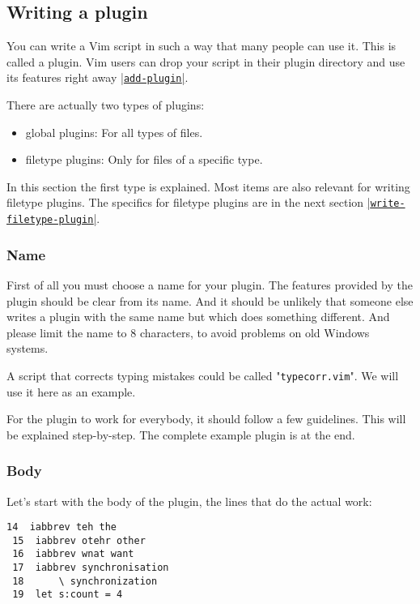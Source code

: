 \subsection{Writing a plugin}
\label{Writing a plugin}
\label{write-plugin}
You can write a Vim script in such a way that many people can use it.
This is called a plugin.
Vim users can drop your script in their plugin directory and use its features right away \hyperref[add-plugin]{|\texttt{add-plugin}|}.

There are actually two types of plugins:
\begin{itemize}
				\item global plugins: For all types of files.
				\item filetype plugins: Only for files of a specific type.
\end{itemize}

In this section the first type is explained.
Most items are also relevant for writing filetype plugins.
The specifics for filetype plugins are in the next section \hyperref[write-filetype-plugin]{|\texttt{write-filetype-plugin}|}.

\subsubsection{Name}
First of all you must choose a name for your plugin.
The features provided by the plugin should be clear from its name.
And it should be unlikely that someone else writes a plugin with the same name but which does something different.
And please limit the name to 8 characters, to avoid problems on old Windows systems.

A script that corrects typing mistakes could be called "\verb!typecorr.vim!".
We will use it here as an example.

For the plugin to work for everybody, it should follow a few guidelines.
This will be explained step-by-step.
The complete example plugin is at the end.

\subsubsection{Body}
Let's start with the body of the plugin, the lines that do the actual work:

\begin{Verbatim}[samepage=true]
 14  iabbrev teh the
 15  iabbrev otehr other
 16  iabbrev wnat want
 17  iabbrev synchronisation
 18      \ synchronization
 19  let s:count = 4
\end{Verbatim}

